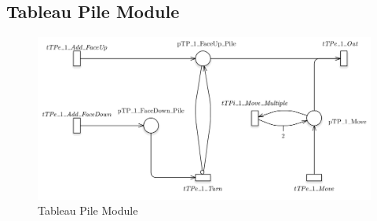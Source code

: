 \documentclass[runningheads,a4paper]{llncs}
\begin{document}
\subsection{Tableau Pile Module}

\begin{figure}
	\begin{center}
		\includegraphics[width=\textwidth]{images/tableauPile}
		\caption{Tableau Pile Module}
	\end{center}
\end{figure}
\end{document}
